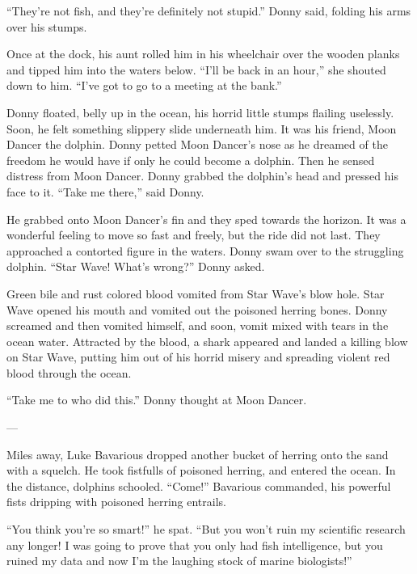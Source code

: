``They're not fish, and they're definitely not stupid.'' Donny said,
folding his arms over his stumps.



Once at the dock, his aunt rolled him in his wheelchair over the
wooden planks and tipped him into the waters below. ``I'll be back
in an hour,'' she shouted down to him. ``I've got to go to a meeting
at the bank.''



Donny floated, belly up in the ocean, his horrid little stumps
flailing uselessly. Soon, he felt something slippery slide
underneath him. It was his friend, Moon Dancer the dolphin. Donny
petted Moon Dancer's nose as he dreamed of the freedom he would
have if only he could become a dolphin. Then he sensed distress
from Moon Dancer. Donny grabbed the dolphin's head and pressed his
face to it. ``Take me there,'' said Donny.



He grabbed onto Moon Dancer's fin and they sped towards the
horizon. It was a wonderful feeling to move so fast and freely, but
the ride did not last. They approached a contorted figure in the
waters. Donny swam over to the struggling dolphin. ``Star Wave!
What's wrong?'' Donny asked.



Green bile and rust colored blood vomited from Star Wave's blow
hole. Star Wave opened his mouth and vomited out the poisoned
herring bones. Donny screamed and then vomited himself, and soon,
vomit mixed with tears in the ocean water. Attracted by the blood,
a shark appeared and landed a killing blow on Star Wave, putting
him out of his horrid misery and spreading violent red blood
through the ocean.



``Take me to who did this.'' Donny thought at Moon Dancer.



---



Miles away, Luke Bavarious dropped another bucket of herring onto
the sand with a squelch. He took fistfulls of poisoned herring, and
entered the ocean. In the distance, dolphins schooled. ``Come!''
Bavarious commanded, his powerful fists dripping with poisoned
herring entrails.



``You think you're so smart!'' he spat. ``But you won't ruin my
scientific research any longer! I was going to prove that you only
had fish intelligence, but you ruined my data and now I'm the
laughing stock of marine biologists!''



